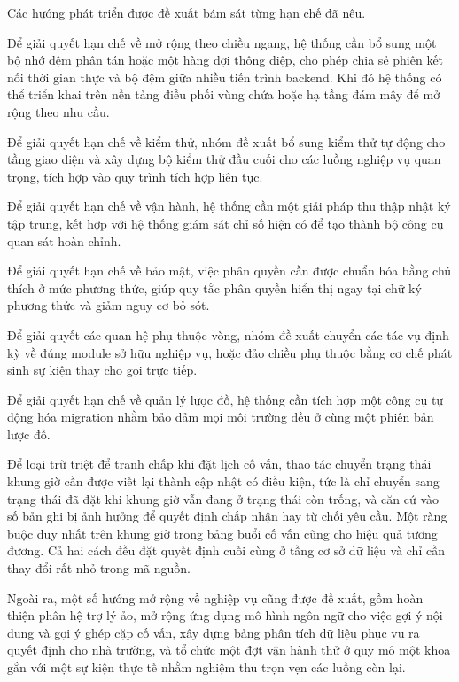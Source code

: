 \documentclass[12pt,a4paper,oneside]{report}
\begin{document}
Các hướng phát triển được đề xuất bám sát từng hạn chế đã nêu.

Để giải quyết hạn chế về mở rộng theo chiều ngang, hệ thống cần bổ sung một bộ nhớ đệm phân tán hoặc một hàng đợi thông điệp, cho phép chia sẻ phiên kết nối thời gian thực và bộ đệm giữa nhiều tiến trình backend. Khi đó hệ thống có thể triển khai trên nền tảng điều phối vùng chứa hoặc hạ tầng đám mây để mở rộng theo nhu cầu.

Để giải quyết hạn chế về kiểm thử, nhóm đề xuất bổ sung kiểm thử tự động cho tầng giao diện và xây dựng bộ kiểm thử đầu cuối cho các luồng nghiệp vụ quan trọng, tích hợp vào quy trình tích hợp liên tục.

Để giải quyết hạn chế về vận hành, hệ thống cần một giải pháp thu thập nhật ký tập trung, kết hợp với hệ thống giám sát chỉ số hiện có để tạo thành bộ công cụ quan sát hoàn chỉnh.

Để giải quyết hạn chế về bảo mật, việc phân quyền cần được chuẩn hóa bằng chú thích ở mức phương thức, giúp quy tắc phân quyền hiển thị ngay tại chữ ký phương thức và giảm nguy cơ bỏ sót.

Để giải quyết các quan hệ phụ thuộc vòng, nhóm đề xuất chuyển các tác vụ định kỳ về đúng module sở hữu nghiệp vụ, hoặc đảo chiều phụ thuộc bằng cơ chế phát sinh sự kiện thay cho gọi trực tiếp.

Để giải quyết hạn chế về quản lý lược đồ, hệ thống cần tích hợp một công cụ tự động hóa migration nhằm bảo đảm mọi môi trường đều ở cùng một phiên bản lược đồ.

Để loại trừ triệt để tranh chấp khi đặt lịch cố vấn, thao tác chuyển trạng thái khung giờ cần được viết lại thành cập nhật có điều kiện, tức là chỉ chuyển sang trạng thái đã đặt khi khung giờ vẫn đang ở trạng thái còn trống, và căn cứ vào số bản ghi bị ảnh hưởng để quyết định chấp nhận hay từ chối yêu cầu. Một ràng buộc duy nhất trên khung giờ trong bảng buổi cố vấn cũng cho hiệu quả tương đương. Cả hai cách đều đặt quyết định cuối cùng ở tầng cơ sở dữ liệu và chỉ cần thay đổi rất nhỏ trong mã nguồn.

Ngoài ra, một số hướng mở rộng về nghiệp vụ cũng được đề xuất, gồm hoàn thiện phân hệ trợ lý ảo, mở rộng ứng dụng mô hình ngôn ngữ cho việc gợi ý nội dung và gợi ý ghép cặp cố vấn, xây dựng bảng phân tích dữ liệu phục vụ ra quyết định cho nhà trường, và tổ chức một đợt vận hành thử ở quy mô một khoa gắn với một sự kiện thực tế nhằm nghiệm thu trọn vẹn các luồng còn lại.
\end{document}
